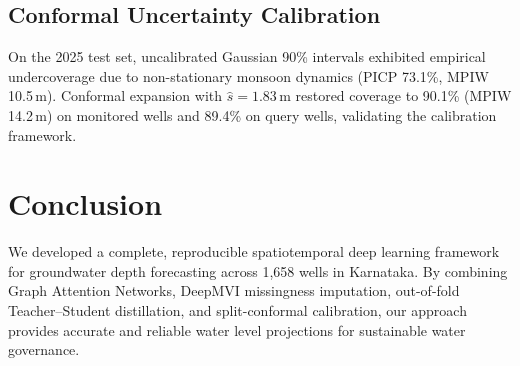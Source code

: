 \documentclass[10pt,journal,compsoc]{IEEEtran}
\begin{document}
\subsection{Conformal Uncertainty Calibration}
On the 2025 test set, uncalibrated Gaussian 90\% intervals exhibited empirical undercoverage due to non-stationary monsoon dynamics (PICP 73.1\%, MPIW 10.5\,m). Conformal expansion with $\hat{s}=1.83$\,m restored coverage to 90.1\% (MPIW 14.2\,m) on monitored wells and 89.4\% on query wells, validating the calibration framework.

\section{Conclusion}
We developed a complete, reproducible spatiotemporal deep learning framework for groundwater depth forecasting across 1,658 wells in Karnataka. By combining Graph Attention Networks, DeepMVI missingness imputation, out-of-fold Teacher--Student distillation, and split-conformal calibration, our approach provides accurate and reliable water level projections for sustainable water governance.



\end{document}
